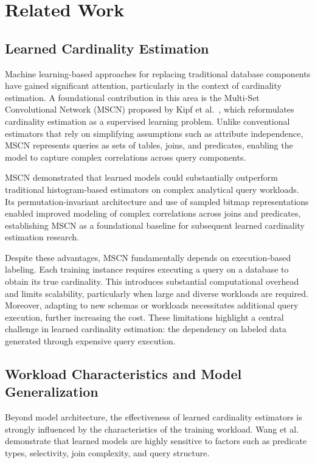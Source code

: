 \chapter{Related Work}
\label{chap:relatedwork}
\pagestyle{plain}

\section{Learned Cardinality Estimation}

Machine learning-based approaches for replacing traditional database components have gained significant attention, particularly in the context of cardinality estimation. A foundational contribution in this area is the Multi-Set Convolutional Network (MSCN) proposed by Kipf et al.~\cite{DBLP:conf/cidr/KipfKRLBK19}, which reformulates cardinality estimation as a supervised learning problem. Unlike conventional estimators that rely on simplifying assumptions such as attribute independence, MSCN represents queries as sets of tables, joins, and predicates, enabling the model to capture complex correlations across query components.

MSCN demonstrated that learned models could substantially outperform traditional histogram-based estimators on complex analytical query workloads.
Its permutation-invariant architecture and use of sampled bitmap representations enabled improved modeling of complex correlations across joins and predicates,
establishing MSCN as a foundational baseline for subsequent learned cardinality estimation research.

Despite these advantages, MSCN fundamentally depends on execution-based labeling. Each training instance requires executing a query on a database to obtain its true cardinality. This introduces substantial computational overhead and limits scalability, particularly when large and diverse workloads are required. Moreover, adapting to new schemas or workloads necessitates additional query execution, further increasing the cost. These limitations highlight a central challenge in learned cardinality estimation: the dependency on labeled data generated through expensive query execution.

\section{Workload Characteristics and Model Generalization}

Beyond model architecture, the effectiveness of learned cardinality estimators is strongly influenced by the characteristics of the training workload. Wang et al.~\cite{DBLP:journals/pvldb/WangQWWZ21} demonstrate that learned models are highly sensitive to factors such as predicate types, selectivity, join complexity, and query structure.

